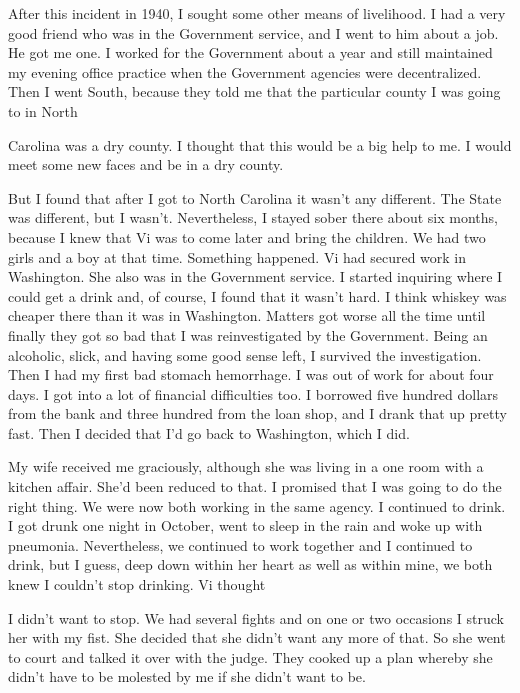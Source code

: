 After this incident in 1940, I sought some other means of livelihood. I had a very good friend who was in the Government service, and I went to him about a job. He got me one. I worked for the Government about a year and still maintained my evening office practice when the Government agencies were decentralized. Then I went South, because they told me that the particular county I was going to in North

Carolina was a dry county. I thought that this would be a big help to me. I would meet some new faces and be in a dry county.

But I found that after I got to North Carolina it wasn’t any different. The State was different, but I wasn’t. Nevertheless, I stayed sober there about six months, because I knew that Vi was to come later and bring the children. We had two girls and a boy at that time. Something happened. Vi had secured work in Washington. She also was in the Government service. I started inquiring where I could get a drink and, of course, I found that it wasn’t hard. I think whiskey was cheaper there than it was in Washington. Matters got worse all the time until finally they got so bad that I was reinvestigated by the Government. Being an alcoholic, slick, and having some good sense left, I survived the investigation. Then I had my first bad stomach hemorrhage. I was out of work for about four days. I got into a lot of financial difficulties too. I borrowed five hundred dollars from the bank and three hundred from the loan shop, and I drank that up pretty fast. Then I decided that I’d go back to Washington, which I did.

My wife received me graciously, although she was living in a one room with a kitchen affair. She’d been reduced to that. I promised that I was going to do the right thing. We were now both working in the same agency. I continued to drink. I got drunk one night in October, went to sleep in the rain and woke up with pneumonia. Nevertheless, we continued to work together and I continued to drink, but I guess, deep down within her heart as well as within mine, we both knew I couldn’t stop drinking. Vi thought

I didn’t want to stop. We had several fights and on one or two occasions I struck her with my fist. She decided that she didn’t want any more of that. So she went to court and talked it over with the judge. They cooked up a plan whereby she didn’t have to be molested by me if she didn’t want to be.


